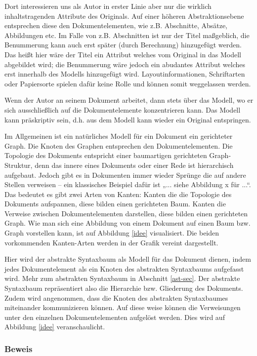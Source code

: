  
Dort interessieren uns als Autor in erster Linie aber nur die wirklich inhaltstragenden Attribute des Originals. Auf einer höheren Abstraktionsebene entsprechen diese den Dokumentelementen, wie z.B. Abschnitte, Absätze, Abbildungen etc. Im Falle von z.B. Abschnitten ist nur der Titel maßgeblich, die Benummerung kann auch erst später (durch Berechnung) hinzugefügt werden. Das heißt hier wäre der Titel ein Attribut welches vom Original in das Modell abgebildet wird; die Benummerung wäre jedoch ein abudantes Attribut welches erst innerhalb des Modells hinzugefügt wird. Layoutinformationen, Schriftarten oder Papiersorte spielen dafür keine Rolle und können somit weggelassen werden.

 
Wenn der Autor an seinem Dokument arbeitet, dann stets über das Modell, wo er sich ausschließlich auf die Dokumentelemente konzentrieren kann. Das Modell kann präskriptiv sein, d.h. aus dem Modell kann wieder ein Original entspringen.

 
Im Allgemeinen ist ein natürliches Modell für ein Dokument ein gerichteter Graph. Die Knoten des Graphen entsprechen den Dokumentelementen. Die Topologie des Dokuments entspricht einer baumartigen gerichteten Graph-Struktur, denn das innere eines Dokuments oder einer Rede ist hierarchisch aufgebaut. Jedoch gibt es in Dokumenten immer wieder Sprünge die auf andere Stellen verweisen -- ein klassisches Beispiel dafür ist „... siehe Abbildung x für ...“. Das bedeutet es gibt zwei Arten von Kanten: Kanten die die Topologie des Dokuments aufspannen, diese bilden einen gerichteten Baum. Kanten die Verweise zwischen Dokumentelementen darstellen, diese bilden einen gerichteten Graph. Wie man sich eine Abbildung von einem Dokument auf einen Baum bzw. Graph vorstellen kann, ist auf Abbildung \ref{idee} visualisiert. Die beiden vorkommenden Kanten-Arten werden in der Grafik vereint dargestellt.

 
Hier wird der abstrakte Syntaxbaum als Modell für das Dokument dienen, indem jedes Dokumentelement als ein Knoten des abstrakten Syntaxbaums aufgefasst wird. Mehr zum abstrakten Syntaxbaum in Abschnitt \ref{ast-sec}. Der abstrakte Syntaxbaum repräsentiert also die Hierarchie bzw. Gliederung des Dokuments. Zudem wird angenommen, dass die Knoten des abstrakten Syntaxbaumes miteinander kommunizieren können. Auf diese weise können die Verweisungen unter den einzelnen Dokumentelementen aufgelöst werden. Dies wird auf Abbildung \ref{idee} veranschaulicht.

 
\subsubsection{Beweis}\label{}

